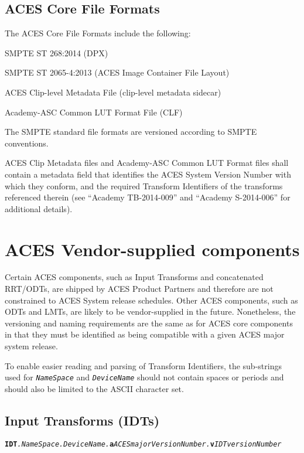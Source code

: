 \subsection{ACES Core File Formats}
The ACES Core File Formats include the following:

\begin{listize}[-]
	\item SMPTE ST 268:2014 (DPX)
	\item SMPTE ST 2065-4:2013 (ACES Image Container File Layout)
	\item ACES Clip-level Metadata File (clip-level metadata sidecar)
	\item Academy-ASC Common LUT Format File (CLF)
\end{listize}

The SMPTE standard file formats are versioned according to SMPTE conventions.

ACES Clip Metadata files and Academy-ASC Common LUT Format files shall contain a metadata field that identifies the ACES System Version Number with which they conform, and the required Transform Identifiers of the transforms referenced therein (see ``Academy TB-2014-009'' and ``Academy S-2014-006'' for additional details).

\section{ACES Vendor-supplied components}
Certain ACES components, such as Input Transforms and concatenated RRT/ODTs, are shipped by ACES Product Partners and therefore are not constrained to ACES System release schedules. Other ACES components, such as ODTs and LMTs, are likely to be vendor-supplied in the future. Nonetheless, the versioning and naming requirements are the same as for ACES core components in that they must be identified as being compatible with a given ACES major system release.

To enable easier reading and parsing of Transform Identifiers, the sub-strings used for \texttt{\textit{NameSpace}} and \texttt{\textit{DeviceName}} should not contain spaces or periods and should also be limited to the ASCII character set.

\subsection{Input Transforms (IDTs)}

\texttt{\textbf{IDT}\textit{.NameSpace.DeviceName.}\textbf{a}\textit{ACESmajorVersionNumber.}\textbf{v}\textit{IDTversionNumber}}

